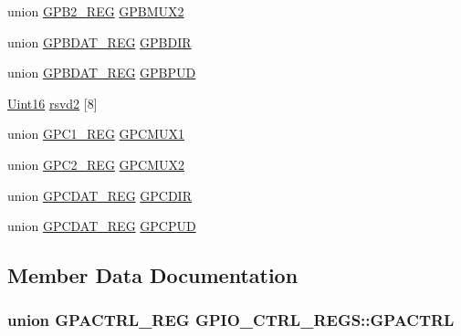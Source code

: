 \begin{DoxyCompactItemize}
\item 
union \hyperlink{union_g_p_b2___r_e_g}{G\+P\+B2\+\_\+\+R\+E\+G} \hyperlink{struct_g_p_i_o___c_t_r_l___r_e_g_s_a6509aaecb7ca2acbf8d7c60fc2fd01fb}{G\+P\+B\+M\+U\+X2}
\item 
union \hyperlink{union_g_p_b_d_a_t___r_e_g}{G\+P\+B\+D\+A\+T\+\_\+\+R\+E\+G} \hyperlink{struct_g_p_i_o___c_t_r_l___r_e_g_s_aeb62e68c3105aa59a3a5ddd435df992d}{G\+P\+B\+D\+I\+R}
\item 
union \hyperlink{union_g_p_b_d_a_t___r_e_g}{G\+P\+B\+D\+A\+T\+\_\+\+R\+E\+G} \hyperlink{struct_g_p_i_o___c_t_r_l___r_e_g_s_a6e2d71ceebe281273d7bcc8b3c33f8b3}{G\+P\+B\+P\+U\+D}
\item 
\hyperlink{_d_s_p2833x___device_8h_a59a9f6be4562c327cbfb4f7e8e18f08b}{Uint16} \hyperlink{struct_g_p_i_o___c_t_r_l___r_e_g_s_a80a3eb93df3580588149e86f587dfb45}{rsvd2} \mbox{[}8\mbox{]}
\item 
union \hyperlink{union_g_p_c1___r_e_g}{G\+P\+C1\+\_\+\+R\+E\+G} \hyperlink{struct_g_p_i_o___c_t_r_l___r_e_g_s_a4980e901fb42e14422cd5d5ddc29e83b}{G\+P\+C\+M\+U\+X1}
\item 
union \hyperlink{union_g_p_c2___r_e_g}{G\+P\+C2\+\_\+\+R\+E\+G} \hyperlink{struct_g_p_i_o___c_t_r_l___r_e_g_s_aa23b53932adcdb1c3e053da067ee1482}{G\+P\+C\+M\+U\+X2}
\item 
union \hyperlink{union_g_p_c_d_a_t___r_e_g}{G\+P\+C\+D\+A\+T\+\_\+\+R\+E\+G} \hyperlink{struct_g_p_i_o___c_t_r_l___r_e_g_s_aa21ffe3472f7d490570823972c218142}{G\+P\+C\+D\+I\+R}
\item 
union \hyperlink{union_g_p_c_d_a_t___r_e_g}{G\+P\+C\+D\+A\+T\+\_\+\+R\+E\+G} \hyperlink{struct_g_p_i_o___c_t_r_l___r_e_g_s_a30a13b7a36f5076dd87c7957c9d9461f}{G\+P\+C\+P\+U\+D}
\end{DoxyCompactItemize}


\subsection{Member Data Documentation}
\hypertarget{struct_g_p_i_o___c_t_r_l___r_e_g_s_ad99e4d5e7720e5c446fbe5b908774d99}{}
\subsubsection[{G\+P\+A\+C\+T\+R\+L}]{\setlength{\rightskip}{0pt plus 5cm}union {\bf G\+P\+A\+C\+T\+R\+L\+\_\+\+R\+E\+G} G\+P\+I\+O\+\_\+\+C\+T\+R\+L\+\_\+\+R\+E\+G\+S\+::\+G\+P\+A\+C\+T\+R\+L}\label{struct_g_p_i_o___c_t_r_l___r_e_g_s_ad99e4d5e7720e5c446fbe5b908774d99}
\hypertarget{struct_g_p_i_o___c_t_r_l___r_e_g_s_a38950b2a5bf15f007c127ed833d8ed70}{}
